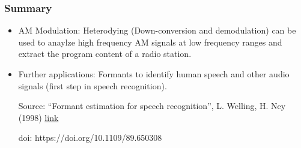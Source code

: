 \documentclass[../main.tex]{subfiles}
\begin{document}
\subsubsection*{Summary}

\begin{itemize}
    \item AM Modulation: Heterodying (Down-conversion and demodulation) can be used to anaylze high frequency AM signals at low frequency ranges and extract the program content of a radio station.
    \item Further applications: Formants to identify human speech and other audio signals (first step in speech recognition).

    Source: ``Formant estimation for speech recognition'', L. Welling, H. Ney (1998) \href{https://ieeexplore.ieee.org/abstract/document/650308}{link}

    doi: https://doi.org/10.1109/89.650308
\end{itemize}
\end{document}
